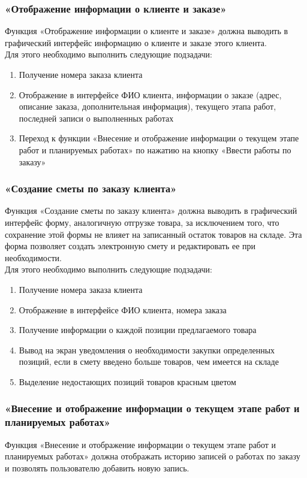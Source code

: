 \documentclass[a4paper,12pt]{article}
\begin{document}
\subsubsection{«Отображение информации о клиенте и заказе»}
Функция «Отображение информации о клиенте и заказе» должна выводить в графический интерфейс информацию о клиенте и заказе этого клиента.\\

Для этого необходимо выполнить следующие подзадачи:
\begin{enumerate}
    \item Получение номера заказа клиента
    \item Отображение в интерфейсе ФИО клиента, информации о заказе (адрес, описание заказа, дополнительная информация), текущего этапа работ, последней записи о выполненных работах
    \item Переход к функции «Внесение и отображение информации о текущем этапе работ и планируемых работах» по нажатию на кнопку «Ввести работы по заказу»
\end{enumerate}

\subsubsection{«Создание сметы по заказу клиента»}
Функция «Создание сметы по заказу клиента» должна выводить в графический интерфейс форму, аналогичную отгрузке товара, за исключением того, что сохранение этой формы не влияет на записанный остаток товаров на складе. Эта форма позволяет создать электронную смету и редактировать ее при необходимости.\\

Для этого необходимо выполнить следующие подзадачи:
\begin{enumerate}
    \item Получение номера заказа клиента
    \item Отображение в интерфейсе ФИО клиента, номера заказа
    \item Получение информации о каждой позиции предлагаемого товара
    \item Вывод на экран уведомления о необходимости закупки определенных позиций, если в смету введено больше товаров, чем имеется на складе
    \item Выделение недостающих позиций товаров красным цветом
\end{enumerate}

\subsubsection{«Внесение и отображение информации о текущем этапе работ и планируемых работах»}
Функция «Внесение и отображение информации о текущем этапе работ и планируемых работах» должна отображать историю записей о работах по заказу и позволять пользователю добавить новую запись.\\
\end{document}
